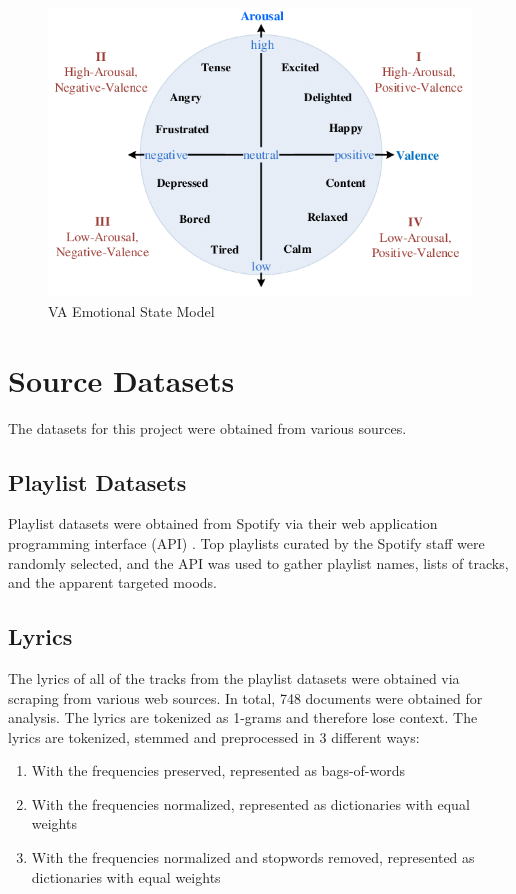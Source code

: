 \documentclass[11pt]{article}
\begin{document}
\begin{figure}[!ht]
  \includegraphics[scale=0.45]{../statics/va_.png}
  \centering
  \caption{VA Emotional State Model}
  \label{fig:va}
\end{figure}

\section{Source Datasets}

The datasets for this project were obtained from various sources.

\subsection{Playlist Datasets}

Playlist datasets were obtained from Spotify via their web application programming interface (API) \cite{spotify}. Top playlists curated by the Spotify staff were randomly selected, and the API was used to gather playlist names, lists of tracks, and the apparent targeted moods.

\subsection{Lyrics}

The lyrics of all of the tracks from the playlist datasets were obtained via scraping from various web sources. In total, 748 documents were obtained for analysis. The lyrics are tokenized as 1-grams and therefore lose context. The lyrics are tokenized, stemmed and preprocessed in 3 different ways:
\begin{enumerate}
  \item With the frequencies preserved, represented as bags-of-words
  \item With the frequencies normalized, represented as dictionaries with equal weights
  \item With the frequencies normalized and stopwords removed, represented as dictionaries with equal weights
\end{enumerate}
\end{document}
